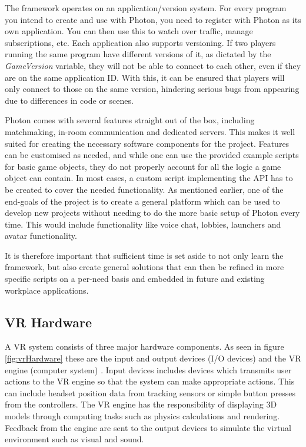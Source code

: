 The framework operates on an application/version system. For every program you intend to create and use with Photon, you need to register with Photon as its own application. You can then use this to watch over traffic, manage subscriptions, etc. Each application also supports versioning. If two players running the same program have different versions of it, as dictated by the \textit{GameVersion} variable, they will not be able to connect to each other, even if they are on the same application ID. With this, it can be ensured that players will only connect to those on the same version, hindering serious bugs from appearing due to differences in code or scenes.

Photon comes with several features straight out of the box, including matchmaking, in-room communication and dedicated servers. This makes it well suited for creating the necessary software components for the project. Features can be customised as needed, and while one can use the provided example scripts for basic game objects, they do not properly account for all the logic a game object can contain. In most cases, a custom script implementing the API has to be created to cover the needed functionality. As mentioned earlier, one of the end-goals of the project is to create a general platform which can be used to develop new projects without needing to do the more basic setup of Photon every time. This would include functionality like voice chat, lobbies, launchers and avatar functionality.

It is therefore important that sufficient time is set aside to not only learn the framework, but also create general solutions that can then be refined in more specific scripts on a per-need basis and embedded in future and existing workplace applications.



\subsection{VR Hardware}
\label{section:VRhardware}
A VR system consists of three major hardware components. As seen in figure \ref{fig:vrHardware} these are the input and output devices (I/O devices) and the VR engine (computer system) \cite{bamodu2013virtual}.  
Input devices includes devices which transmits user actions to the VR engine so that the system can make appropriate actions. This can include headset position data from tracking sensors or simple button presses from the controllers. The VR engine has the responsibility of displaying 3D models through computing tasks such as physics calculations and rendering. Feedback from the engine are sent to the output devices to simulate the virtual environment such as visual and sound.         

